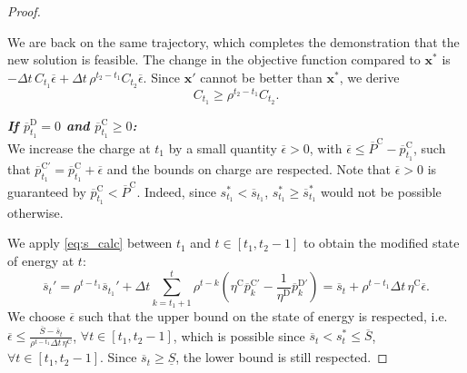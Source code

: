 \documentclass[10pt,a4paper]{amsart}
\newcommand{\up}[1]{^{\mathrm{#1}}}
\begin{document}
\begin{proof}
\begin{itemize}
\begin{equation}
        \end{equation}
        We are back on the same trajectory, which completes the demonstration that the new solution is feasible. The change in the objective function compared to $\mathbf{x}^*$ is $- \Delta t \, C_{t_1} \overline{\epsilon} + \Delta t \, \rho^{t_2 - t_1} C_{t_2} \overline{\epsilon}$. Since $\mathbf{x}'$ cannot be better than $\mathbf{x}^*$, we derive
        \begin{equation} \label{eq:overline_pd_pd}
            C_{t_1} \geq \rho^{t_2 - t_1} C_{t_2}.
        \end{equation}
    \end{itemize}

    \textit{\textbf{If $\overline{p}\up{D}_{t_1}=0$ and $\overline{p}\up{C}_{t_1}\geq0$:}} \\ 
    We increase the charge at $t_1$ by a small quantity $\overline{\epsilon} > 0$, with $\overline{\epsilon} \leq \overline{P}\up{C} - \overline{p}\up{C}_{t_1}$, such that $\overline{p}\up{C'}_{t_1}=\overline{p}\up{C}_{t_1}+\overline{\epsilon}$ and the bounds on charge are respected. Note that $\overline{\epsilon} >0$ is guaranteed by $\overline{p}\up{C}_{t_1} < \overline{P}\up{C}$. Indeed, since ${s}_{t_1}^* < \overline{s}_{t_1}$, ${s}_{t_1}^* \geq \overline{s}_{t_1}^*$ would not be possible otherwise.

    We apply \eqref{eq:s_calc} between $t_1$ and $t \in [t_1,t_2-1]$ to obtain the modified state of energy at $t$:
    \begin{equation}
        \overline{s}_t' = \rho^{t - t_1} \overline{s}_{t_1}' + \Delta t \sum_{k=t_1+1}^{t} \rho^{t - k} \left( \eta\up{C} \overline{p}_k\up{C'} - \frac{1}{\eta\up{D}} \overline{p}_k\up{D'} \right)  = \overline{s}_t + \rho^{t - t_1} \Delta t \, {\eta\up{C}} \overline{\epsilon}.
    \end{equation}
    We choose $\overline{\epsilon}$ such that the upper bound on the state of energy is respected, i.e. $\overline{\epsilon} \leq \frac{\overline{S} -\overline{s}_t}{\rho^{t - t_1} \Delta t \, {\eta\up{C}}}$, $\forall t \in [t_1,t_2-1]$, which is possible since $\overline{s}_t < s_t^* \leq \overline{S}$, $ \forall t \in [t_1,t_2-1]$. 
    Since $\overline{s}_t \geq \underline{S}$, the lower bound is still respected.


\end{proof}
\end{document}
